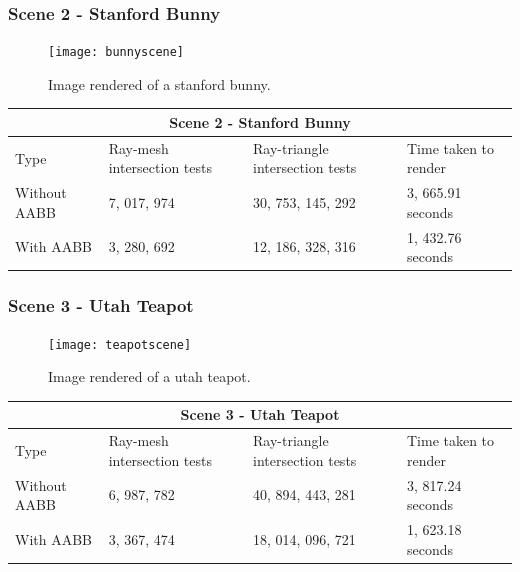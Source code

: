 \documentclass[11pt,a4paper]{article}
\begin{document}
	\subsubsection{Scene 2 - Stanford Bunny}
	\begin{figure}[H]
		\centering
		\captionsetup{justification=centering}
		\texttt{[image: bunnyscene]}\quad
		\caption{Image rendered of a stanford bunny.}
	\end{figure}
	
	\begin{table}[h]
		\centering
		\begin{tabular}{ |p{3cm}||p{3cm}|p{3cm}|p{3cm}|  }
			\hline
			\multicolumn{4}{|c|}{Scene 2 - Stanford Bunny} \\
			\hline
			Type   &   Ray-mesh intersection tests  & Ray-triangle intersection tests &   Time taken to render\\
			\hline
			Without AABB   & 7, 017, 974 & 30, 753, 145, 292&   3, 665.91 seconds\\
			With AABB&   3, 280, 692 & 12, 186, 328, 316  &       1, 432.76 seconds\\
			\hline
		\end{tabular}
	\end{table}
	
	\subsubsection{Scene 3 - Utah Teapot}
	\begin{figure}[H]
		\centering
		\captionsetup{justification=centering}
		\texttt{[image: teapotscene]}\quad
		\caption{Image rendered of a utah teapot.}
	\end{figure}
	
	\begin{table}[h]
		\centering
		\begin{tabular}{ |p{3cm}||p{3cm}|p{3cm}|p{3cm}|  }
			\hline
			\multicolumn{4}{|c|}{Scene 3 - Utah Teapot} \\
			\hline
			Type   &   Ray-mesh intersection tests  & Ray-triangle intersection tests &   Time taken to render\\
			\hline
			Without AABB   & 6, 987, 782   &40, 894, 443, 281&   3, 817.24 seconds\\
			With AABB&   3, 367, 474 & 18, 014, 096, 721   &       1, 623.18 seconds\\
			\hline
		\end{tabular}
	\end{table}
	
\end{document}
